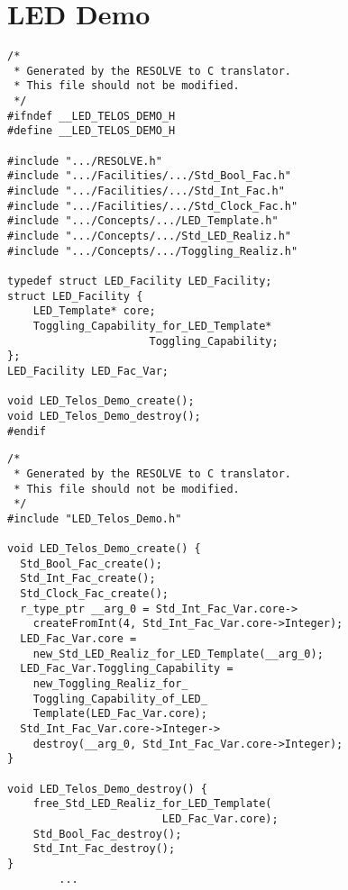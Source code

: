 \section{LED Demo}

\begin{figure*}
\begin{minipage}{0.4\textwidth}
\begin{verbatim}
/*
 * Generated by the RESOLVE to C translator. 
 * This file should not be modified.
 */
#ifndef __LED_TELOS_DEMO_H
#define __LED_TELOS_DEMO_H

#include ".../RESOLVE.h"
#include ".../Facilities/.../Std_Bool_Fac.h"
#include ".../Facilities/.../Std_Int_Fac.h"
#include ".../Facilities/.../Std_Clock_Fac.h"
#include ".../Concepts/.../LED_Template.h"
#include ".../Concepts/.../Std_LED_Realiz.h"
#include ".../Concepts/.../Toggling_Realiz.h"

typedef struct LED_Facility LED_Facility;
struct LED_Facility {
    LED_Template* core;
    Toggling_Capability_for_LED_Template* 
                      Toggling_Capability;
};
LED_Facility LED_Fac_Var;

void LED_Telos_Demo_create();
void LED_Telos_Demo_destroy();
#endif
\end{verbatim}
\end{minipage}
\hspace{1.5cm} 
\begin{minipage}{0.4\textwidth}
\begin{verbatim}
/*
 * Generated by the RESOLVE to C translator. 
 * This file should not be modified.
 */
#include "LED_Telos_Demo.h"

void LED_Telos_Demo_create() {
  Std_Bool_Fac_create();
  Std_Int_Fac_create();
  Std_Clock_Fac_create();
  r_type_ptr __arg_0 = Std_Int_Fac_Var.core->
    createFromInt(4, Std_Int_Fac_Var.core->Integer);
  LED_Fac_Var.core = 
    new_Std_LED_Realiz_for_LED_Template(__arg_0);
  LED_Fac_Var.Toggling_Capability = 
    new_Toggling_Realiz_for_
    Toggling_Capability_of_LED_
    Template(LED_Fac_Var.core);
  Std_Int_Fac_Var.core->Integer->
    destroy(__arg_0, Std_Int_Fac_Var.core->Integer);
}

void LED_Telos_Demo_destroy() {
    free_Std_LED_Realiz_for_LED_Template(
    				    LED_Fac_Var.core);
    Std_Bool_Fac_destroy();
    Std_Int_Fac_destroy();
}
        ...
\end{verbatim}
\end{minipage}
\end{figure*}


